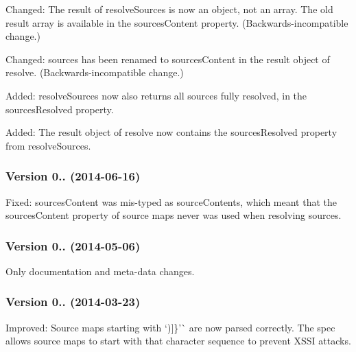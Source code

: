 \begin{DoxyItemize}
\item Changed\+: The result of {\ttfamily resolve\+Sources} is now an object, not an array. The old result array is available in the {\ttfamily sources\+Content} property. (Backwards-\/incompatible change.)
\item Changed\+: {\ttfamily sources} has been renamed to {\ttfamily sources\+Content} in the result object of {\ttfamily resolve}. (Backwards-\/incompatible change.)
\item Added\+: {\ttfamily resolve\+Sources} now also returns all sources fully resolved, in the {\ttfamily sources\+Resolved} property.
\item Added\+: The result object of {\ttfamily resolve} now contains the {\ttfamily sources\+Resolved} property from {\ttfamily resolve\+Sources}.
\end{DoxyItemize}

\subsubsection*{Version 0.. (2014-\/06-\/16)}


\begin{DoxyItemize}
\item Fixed\+: {\ttfamily sources\+Content} was mis-\/typed as {\ttfamily source\+Contents}, which meant that the {\ttfamily sources\+Content} property of source maps never was used when resolving sources.
\end{DoxyItemize}

\subsubsection*{Version 0.. (2014-\/05-\/06)}


\begin{DoxyItemize}
\item Only documentation and meta-\/data changes.
\end{DoxyItemize}

\subsubsection*{Version 0.. (2014-\/03-\/23)}


\begin{DoxyItemize}
\item Improved\+: Source maps starting with `)\mbox{]}\}'\`{} are now parsed correctly. The spec allows source maps to start with that character sequence to prevent X\+S\+SI attacks.
\end{DoxyItemize}


